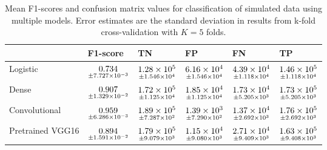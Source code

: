 \begin{table}
\centering
\caption{
Mean F1-scores and confusion matrix values for classification of simulated data 
using multiple models. Error estimates are the standard deviation in results from k-fold
cross-validation with $K=5$ folds.
}
\label{tab:classification-simulated}
\begin{tabular}{llllll}
\toprule
{} &                                            F1-score &                                                     TN &                                                     FP &                                                     FN &                                                     TP \\
\midrule
Logistic         &  $\underset{\num{+- 7.727e-03 }  }{\num{ 0.734 } }$ &  $\underset{\num{+- 1.546e+04 }  }{\num{ 1.28e+05 } }$ &  $\underset{\num{+- 1.546e+04 }  }{\num{ 6.16e+04 } }$ &  $\underset{\num{+- 1.118e+04 }  }{\num{ 4.39e+04 } }$ &  $\underset{\num{+- 1.118e+04 }  }{\num{ 1.46e+05 } }$ \\
Dense            &  $\underset{\num{+- 1.329e-02 }  }{\num{ 0.907 } }$ &  $\underset{\num{+- 1.125e+04 }  }{\num{ 1.72e+05 } }$ &  $\underset{\num{+- 1.125e+04 }  }{\num{ 1.85e+04 } }$ &  $\underset{\num{+- 5.205e+03 }  }{\num{ 1.73e+04 } }$ &  $\underset{\num{+- 5.205e+03 }  }{\num{ 1.73e+05 } }$ \\
Convolutional    &  $\underset{\num{+- 6.286e-03 }  }{\num{ 0.959 } }$ &  $\underset{\num{+- 7.287e+02 }  }{\num{ 1.89e+05 } }$ &  $\underset{\num{+- 7.290e+02 }  }{\num{ 1.39e+03 } }$ &  $\underset{\num{+- 2.692e+03 }  }{\num{ 1.37e+04 } }$ &  $\underset{\num{+- 2.692e+03 }  }{\num{ 1.76e+05 } }$ \\
Pretrained VGG16 &  $\underset{\num{+- 1.591e-02 }  }{\num{ 0.894 } }$ &  $\underset{\num{+- 9.079e+03 }  }{\num{ 1.79e+05 } }$ &  $\underset{\num{+- 9.080e+03 }  }{\num{ 1.15e+04 } }$ &  $\underset{\num{+- 9.409e+03 }  }{\num{ 2.71e+04 } }$ &  $\underset{\num{+- 9.408e+03 }  }{\num{ 1.63e+05 } }$ \\
\bottomrule
\end{tabular}
\end{table}
